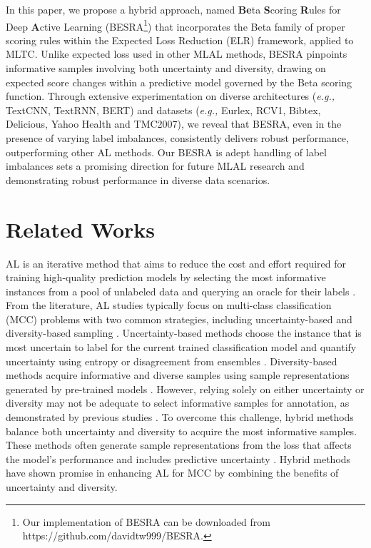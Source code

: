 \documentclass[letterpaper]{article} %
\begin{document}
In this paper, we propose a hybrid approach, named \textbf{Be}ta \textbf{S}coring \textbf{R}ules for Deep \textbf{A}ctive Learning (BESRA\footnote{Our implementation of BESRA can be downloaded from https://github.com/davidtw999/BESRA.}) that incorporates the Beta family of proper scoring rules within the Expected Loss Reduction (ELR) framework, applied to MLTC.
Unlike expected loss used in other MLAL methods, BESRA pinpoints informative samples involving both uncertainty and diversity, drawing on expected score changes within a predictive model governed by the Beta scoring function.
Through extensive experimentation on diverse architectures ({\it e.g.,} TextCNN, TextRNN, BERT) and datasets ({\it e.g.,} Eurlex, RCV1, Bibtex, Delicious, Yahoo Health and TMC2007), we reveal that BESRA, even in the presence of varying label imbalances, consistently delivers robust performance, outperforming other AL methods.
Our BESRA is adept handling of label imbalances sets a promising direction for future MLAL research and demonstrating robust performance in diverse data scenarios.





\section{Related Works}
\label{sec:Related}

AL is an iterative method that aims to reduce the cost and effort required for training high-quality prediction models by selecting the most informative instances from a pool of unlabeled data and querying an oracle for their labels \cite{settles2009active, BEMPS_Wei_NEURIPS2011}. From the literature, AL studies typically focus on multi-class classification (MCC) problems with two common strategies, including uncertainty-based and diversity-based sampling \cite{ren2020survey}. Uncertainty-based methods choose the instance that is most uncertain to label for the current trained classification model and quantify uncertainty using entropy or disagreement from ensembles \cite{holub2008entropy}. Diversity-based methods acquire informative and diverse samples using sample representations generated by pre-trained models \cite{ash2019deep}. However, relying solely on either uncertainty or diversity may not be adequate to select informative samples for annotation, as demonstrated by previous studies \cite{ren2020survey, TanDuBun-IEEEPAMI23}. To overcome this challenge, hybrid methods balance both uncertainty and diversity to acquire the most informative samples. These methods often generate sample representations from the loss that affects the model's performance and includes predictive uncertainty \cite{ash2019deep, TanDuBun-IEEEPAMI23}.
Hybrid methods have shown promise in enhancing AL for MCC by combining the benefits of uncertainty and diversity.
\end{document}
